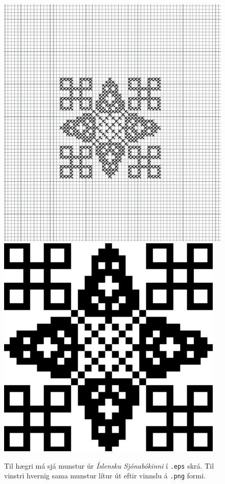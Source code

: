 \documentclass[a4paper,12pt]{article}
\begin{document}
\begin{figure}
    \centering
    \includegraphics[height=.3\textheight]{figs/sjonabok_before.png}
    \includegraphics[height=.3\textheight]{figs/sjonabok_after.png}
    \caption{Til hægri má sjá munstur úr \textit{Íslensku Sjónabókinni} í \texttt{.eps} skrá. Til vinstri hvernig sama munstur lítur út eftir vinnslu á \texttt{.png} formi.}
    \label{fig: sjonabok_munstur}
\end{figure}
\end{document}
